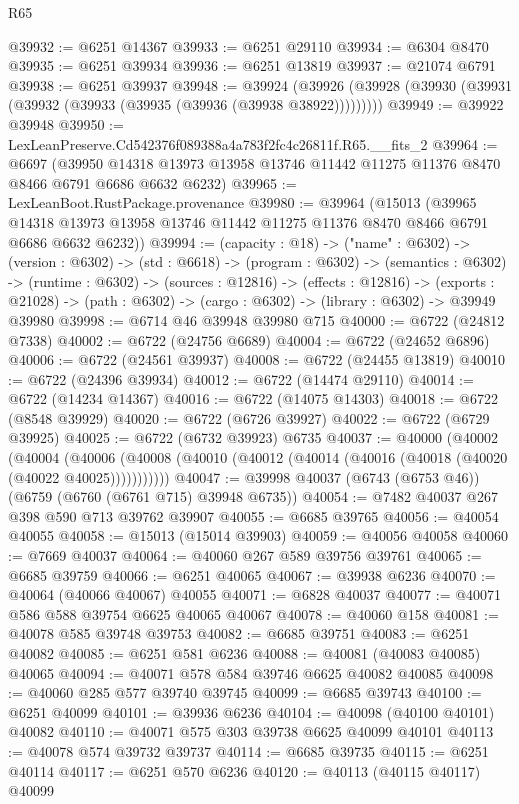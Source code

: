 \begin{lexlean}{R65}
\begin{coremodule}
{@39932 := @6251 @14367
@39933 := @6251 @29110
@39934 := @6304 @8470
@39935 := @6251 @39934
@39936 := @6251 @13819
@39937 := @21074 @6791
@39938 := @6251 @39937
@39948 := @39924
    (@39926 (@39928 (@39930 (@39931 (@39932 (@39933 (@39935 (@39936 (@39938 @38922)))))))))
@39949 := @39922 @39948
@39950 := LexLeanPreserve.Cd542376f089388a4a783f2fc4c26811f.R65.__fits_2
@39964 := @6697
    (@39950 @14318 @13973 @13958 @13746 @11442 @11275 @11376 @8470 @8466 @6791 @6686 @6632 @6232)
@39965 := LexLeanBoot.RustPackage.provenance
@39980 := @39964
    (@15013
      (@39965 @14318 @13973 @13958 @13746 @11442 @11275 @11376 @8470 @8466 @6791 @6686 @6632 @6232))
@39994 := (capacity : @18) ->
  ("name" : @6302) ->
  (version : @6302) ->
  (std : @6618) ->
  (program : @6302) ->
  (semantics : @6302) ->
  (runtime : @6302) ->
  (sources : @12816) ->
  (effects : @12816) ->
  (exports : @21028) -> (path : @6302) -> (cargo : @6302) -> (library : @6302) -> @39949 @39980
@39998 := @6714 @46 @39948 @39980 @715
@40000 := @6722 (@24812 @7338)
@40002 := @6722 (@24756 @6689)
@40004 := @6722 (@24652 @6896)
@40006 := @6722 (@24561 @39937)
@40008 := @6722 (@24455 @13819)
@40010 := @6722 (@24396 @39934)
@40012 := @6722 (@14474 @29110)
@40014 := @6722 (@14234 @14367)
@40016 := @6722 (@14075 @14303)
@40018 := @6722 (@8548 @39929)
@40020 := @6722 (@6726 @39927)
@40022 := @6722 (@6729 @39925)
@40025 := @6722 (@6732 @39923) @6735
@40037 := @40000
    (@40002
      (@40004
        (@40006 (@40008 (@40010 (@40012 (@40014 (@40016 (@40018 (@40020 (@40022 @40025)))))))))))
@40047 := @39998 @40037 (@6743 (@6753 @46)) (@6759 (@6760 (@6761 @715) @39948 @6735))
@40054 := @7482 @40037 @267 @398 @590 @713 @39762 @39907
@40055 := @6685 @39765
@40056 := @40054 @40055
@40058 := @15013 (@15014 @39903)
@40059 := @40056 @40058
@40060 := @7669 @40037
@40064 := @40060 @267 @589 @39756 @39761
@40065 := @6685 @39759
@40066 := @6251 @40065
@40067 := @39938 @6236
@40070 := @40064 (@40066 @40067) @40055
@40071 := @6828 @40037
@40077 := @40071 @586 @588 @39754 @6625 @40065 @40067
@40078 := @40060 @158
@40081 := @40078 @585 @39748 @39753
@40082 := @6685 @39751
@40083 := @6251 @40082
@40085 := @6251 @581 @6236
@40088 := @40081 (@40083 @40085) @40065
@40094 := @40071 @578 @584 @39746 @6625 @40082 @40085
@40098 := @40060 @285 @577 @39740 @39745
@40099 := @6685 @39743
@40100 := @6251 @40099
@40101 := @39936 @6236
@40104 := @40098 (@40100 @40101) @40082
@40110 := @40071 @575 @303 @39738 @6625 @40099 @40101
@40113 := @40078 @574 @39732 @39737
@40114 := @6685 @39735
@40115 := @6251 @40114
@40117 := @6251 @570 @6236
@40120 := @40113 (@40115 @40117) @40099
}
\end{coremodule}
\end{lexlean}
